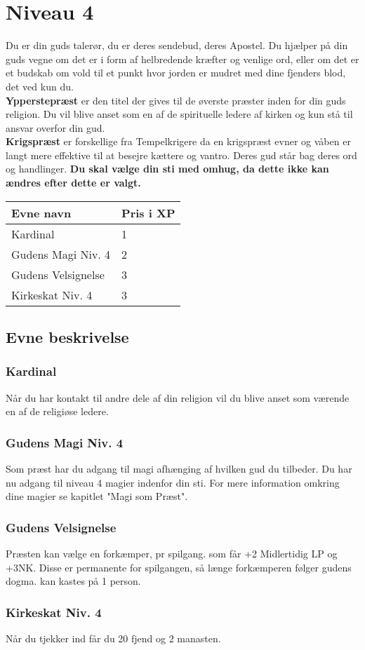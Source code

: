\chapter{Niveau 4}
Du er din guds talerør, du er deres sendebud, deres Apostel. Du hjælper på din guds vegne om det er i form af helbredende kræfter og venlige ord, eller om det er et budskab om vold til et punkt hvor jorden er mudret med dine fjenders blod, det ved kun du.\\
\textbf{Ypperstepræst} er den titel der gives til de øverste præster inden for din guds religion. Du vil blive anset som en af de spirituelle ledere af kirken og kun stå til ansvar overfor din gud.\\
\textbf{Krigspræst} er forskellige fra Tempelkrigere da en krigspræst evner og våben er langt mere effektive til at besejre kættere og vantro. Deres gud står bag deres ord og handlinger.
\textbf{Du skal vælge din sti med omhug, da dette ikke kan ændres efter dette er valgt.}\\

\begin{table}[H]
    \centering
    \begin{tabular}{|p{}|p{}|}
    \rowcolor{cerulean!80}\hline
        Evne navn & Pris i XP \\\hline
            Kardinal & 1\\\hline
            Gudens Magi Niv. 4 & 2\\\hline
            Gudens Velsignelse & 3\\\hline
            Kirkeskat Niv. 4 & 3\\\hline
    \end{tabular}
\end{table}

\section{Evne beskrivelse}


\subsection{Kardinal}
Når du har kontakt til andre dele af din religion vil du blive anset som værende en af de religiøse ledere.

\subsection{Gudens Magi Niv. 4}
Som præst har du adgang til magi afhænging af hvilken gud du tilbeder. Du har nu adgang til niveau 4 magier indenfor din sti. For mere information omkring dine magier se kapitlet "Magi som Præst".

\subsection{Gudens Velsignelse}
Præsten kan vælge en forkæmper, pr spilgang. som får +2 Midlertidig LP og +3NK. Disse er permanente for spilgangen, så længe forkæmperen følger gudens dogma. kan kastes på 1 person.

\subsection{Kirkeskat Niv. 4}
Når du tjekker ind får du 20 fjend og 2 manasten.